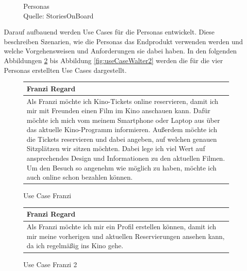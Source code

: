 \begin{figure}[H]
			\caption[Personas ]{\label{fig:personas}Personas \\ Quelle: StoriesOnBoard \footnotemark}
		\end{figure} 
		
		Darauf aufbauend werden Use Cases für die Personas entwickelt. Diese beschreiben Szenarien, wie die Personas das Endprodukt verwenden werden und welche Vorgehensweisen und Anforderungen sie dabei haben. In den folgenden Abbildungen \ref{fig:useCaseFranzi} bis Abbildung \ref{fig:useCaseWalter2} werden die für die vier Personas erstellten Use Cases dargestellt.
		
		\begin{figure}[H]\begin{center}
			\begin{tabular}{p{}}
				\textbf{Franzi Regard} \\\toprule
				Als Franzi möchte ich Kino-Tickets online reservieren, damit ich mir mit Freunden einen Film im Kino anschauen kann. Dafür möchte ich mich vom meinem Smartphone oder Laptop aus über das aktuelle Kino-Programm informieren. Außerdem möchte ich die Tickets reservieren und dabei angeben, auf welchen genauen Sitzplätzen wir sitzen möchten. Dabei lege ich viel Wert auf ansprechendes Design und Informationen zu den aktuellen Filmen. Um den Besuch so angenehm wie möglich zu haben, möchte ich auch online schon bezahlen können.
			\end{tabular}
			\caption[Use Case Franzi]{\label{fig:useCaseFranzi} Use Case Franzi}
		\end{center}
		\end{figure}
	
		\begin{figure}[H] \begin{center}
			\begin{tabular}{p{}}
				\textbf{Franzi Regard} \\\toprule
				Als Franzi möchte ich mir ein Profil erstellen können, damit ich mir meine vorherigen und aktuellen Reservierungen ansehen kann, da ich regelmäßig ins Kino gehe. 
			\end{tabular}
			\caption[Use Case Franzi 2]{\label{fig:useCaseFranzi2} Use Case Franzi 2}
		\end{center}
		\end{figure}
	
